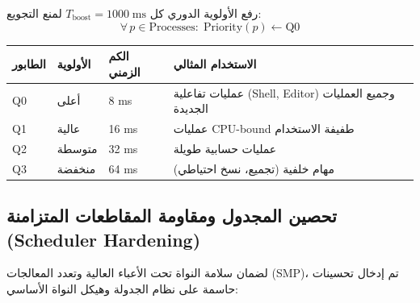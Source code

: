 \documentclass[12pt,a4paper]{article}
\theoremstyle{definition}
\newcommand{\en}[1]{\textenglish{#1}}
\begin{document}
رفع الأولوية الدوري كل $T_{\mathrm{boost}} = 1000\;\mathrm{ms}$ لمنع التجويع:
\begin{equation}
\forall\, p \in \mathrm{Processes}:\; \mathrm{Priority}(p) \gets \mathrm{Q0}
\end{equation}

\vspace{0.3cm}

\begin{center}
\begin{tabular}{C{1.5cm}C{1.5cm}C{1.5cm}L{6cm}}
\toprule
{}
\bfseries\color{white}\textarabic{الطابور} &
\bfseries\color{white}\textarabic{الأولوية} &
\bfseries\color{white}\textarabic{الكم الزمني} &
\bfseries\color{white}\textarabic{الاستخدام المثالي} \\
\midrule
{} \en{Q0} & أعلى & 8 \en{ms} & عمليات تفاعلية (\en{Shell}, \en{Editor}) وجميع العمليات الجديدة \\
\en{Q1} & عالية & 16 \en{ms} & عمليات \en{CPU-bound} طفيفة الاستخدام \\
 \en{Q2} & متوسطة & 32 \en{ms} & عمليات حسابية طويلة \\
\en{Q3} & منخفضة & 64 \en{ms} & مهام خلفية (تجميع، نسخ احتياطي) \\
\bottomrule
\end{tabular}
\end{center}

\subsection{تحصين المجدول ومقاومة المقاطعات المتزامنة (\en{Scheduler Hardening})}

لضمان سلامة النواة تحت الأعباء العالية وتعدد المعالجات (\en{SMP})، تم إدخال تحسينات حاسمة على نظام الجدولة وهيكل النواة الأساسي:
\end{document}
